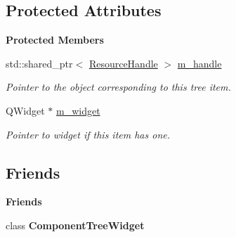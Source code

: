 \subsection*{Protected Attributes}
\begin{Indent}\textbf{ Protected Members}\par
\begin{DoxyCompactItemize}
\item 
\mbox{\label{classrev_1_1_view_1_1_resource_item_a167c16a1b69604ed956b8a140f962f98}} 
std\+::shared\+\_\+ptr$<$ \mbox{\hyperlink{classrev_1_1_resource_handle}{Resource\+Handle}} $>$ \mbox{\hyperlink{classrev_1_1_view_1_1_resource_item_a167c16a1b69604ed956b8a140f962f98}{m\+\_\+handle}}
\begin{DoxyCompactList}\small\item\em Pointer to the object corresponding to this tree item. \end{DoxyCompactList}\item 
\mbox{\label{classrev_1_1_view_1_1_resource_item_a77a1390deba7fa8fd5bff2e4342f9988}} 
Q\+Widget $\ast$ \mbox{\hyperlink{classrev_1_1_view_1_1_resource_item_a77a1390deba7fa8fd5bff2e4342f9988}{m\+\_\+widget}}
\begin{DoxyCompactList}\small\item\em Pointer to widget if this item has one. \end{DoxyCompactList}\end{DoxyCompactItemize}
\end{Indent}
\subsection*{Friends}
\begin{Indent}\textbf{ Friends}\par
\begin{DoxyCompactItemize}
\item 
\mbox{\label{classrev_1_1_view_1_1_resource_item_a350b4d2b555fb1075041d366ade3f718}} 
class {\bfseries Component\+Tree\+Widget}
\end{DoxyCompactItemize}
\end{Indent}
